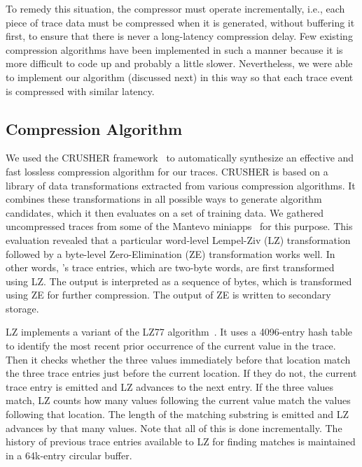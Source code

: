 To remedy this situation, the compressor must operate incrementally, i.e., each piece of trace data must be compressed when it is generated, without buffering it first, to ensure that there is never a long-latency compression delay. Few existing compression algorithms have been implemented in such a manner because it is more difficult to code up and probably a little slower. Nevertheless, we were able to implement our algorithm (discussed next) in this way so that each trace event is compressed with similar latency.


\subsection{Compression Algorithm}
\label{subsec:compAlg}

We used the CRUSHER framework~\cite{mb-cluster15, mb-space16, mb-sc16, mb-dcc18} to automatically synthesize an effective and fast lossless compression algorithm for our traces. CRUSHER is based on a library of data transformations extracted from various compression algorithms. It combines these transformations in all possible ways to generate algorithm candidates, which it then evaluates on a set of training data. We gathered uncompressed traces from some of the Mantevo miniapps~\cite{mantevo} for this purpose. This evaluation revealed that a particular word-level Lempel-Ziv (LZ) transformation followed by a byte-level Zero-Elimination (ZE) transformation works well. In other words, \parlot 's trace entries, which are two-byte words, are first transformed using LZ. The output is interpreted as a sequence of bytes, which is transformed using ZE for further compression. The output of ZE is written to secondary storage.

LZ implements a variant of the LZ77 algorithm~\cite{LZ}. It uses a 4096-entry hash table to identify the most recent prior occurrence of the current value in the trace. Then it checks whether the three values immediately before that location match the three trace entries just before the current location. If they do not, the current trace entry is emitted and LZ advances to the next entry. If the three values match, LZ counts how many values following the current value match the values following that location. The length of the matching substring is emitted and LZ advances by that many values. Note that all of this is done incrementally. The history of previous trace entries available to LZ for finding matches is maintained in a 64k-entry circular buffer. 

